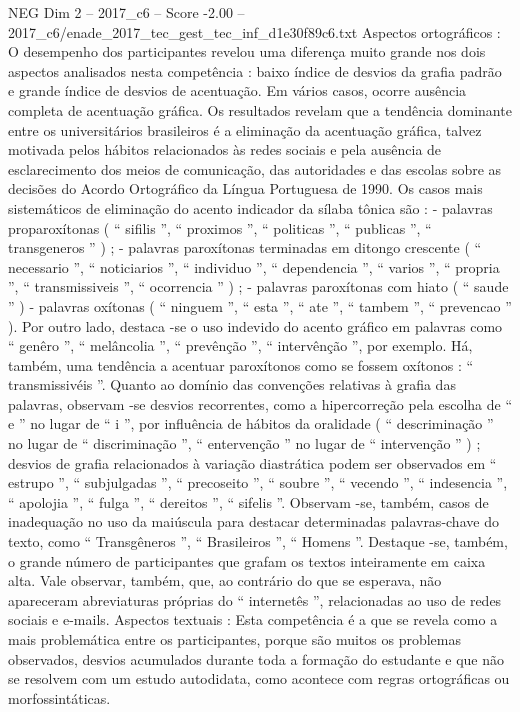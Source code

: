 \begin{textsample}{NEG Dim 2 – 2017\_c6 – Score -2.00 – 2017\_c6/enade\_2017\_tec\_gest\_tec\_inf\_d1e30f89c6.txt}
Aspectos ortográficos : O desempenho dos participantes revelou uma diferença muito grande nos dois aspectos analisados nesta competência : baixo índice de desvios da grafia padrão e grande índice de desvios de acentuação.
Em vários casos, ocorre ausência completa de acentuação gráfica.
Os resultados revelam que a tendência dominante entre os universitários brasileiros é a eliminação da acentuação gráfica, talvez motivada pelos hábitos relacionados às redes sociais e pela ausência de esclarecimento dos meios de comunicação, das autoridades e das escolas sobre as decisões do Acordo Ortográfico da Língua Portuguesa de 1990.
Os casos mais sistemáticos de eliminação do acento indicador da sílaba tônica são : - palavras proparoxítonas ( “ sifilis ”, “ proximos ”, “ politicas ”, “ publicas ”, “ transgeneros ” ) ; - palavras paroxítonas terminadas em ditongo crescente ( “ necessario ”, “ noticiarios ”, “ individuo ”, “ dependencia ”, “ varios ”, “ propria ”, “ transmissiveis ”, “ ocorrencia ” ) ; - palavras paroxítonas com hiato ( “ saude ” ) - palavras oxítonas ( “ ninguem ”, “ esta ”, “ ate ”, “ tambem ”, “ prevencao ” ).
Por outro lado, destaca -se o uso indevido do acento gráfico em palavras como “ genêro ”, “ melâncolia ”, “ prevênção ”, “ intervênção ”, por exemplo.
Há, também, uma tendência a acentuar paroxítonos como se fossem oxítonos : “ transmissivéis ”.
Quanto ao domínio das convenções relativas à grafia das palavras, observam -se desvios recorrentes, como a hipercorreção pela escolha de “ e ” no lugar de “ i ”, por influência de hábitos da oralidade ( “ descriminação ” no lugar de “ discriminação ”, “ entervenção ” no lugar de “ intervenção ” ) ; desvios de grafia relacionados à variação diastrática podem ser observados em “ estrupo ”, “ subjulgadas ”, “ precoseito ”, “ soubre ”, “ vecendo ”, “ indesencia ”, “ apolojia ”, “ fulga ”, “ dereitos ”, “ sifelis ”.
Observam -se, também, casos de inadequação no uso da maiúscula para destacar determinadas palavras-chave do texto, como “ Transgêneros ”, “ Brasileiros ”, “ Homens ”.
Destaque -se, também, o grande número de participantes que grafam os textos inteiramente em caixa alta.
Vale observar, também, que, ao contrário do que se esperava, não apareceram abreviaturas próprias do “ internetês ”, relacionadas ao uso de redes sociais e e-mails.
Aspectos textuais : Esta competência é a que se revela como a mais problemática entre os participantes, porque são muitos os problemas observados, desvios acumulados durante toda a formação do estudante e que não se resolvem com um estudo autodidata, como acontece com regras ortográficas ou morfossintáticas.

\end{textsample}
